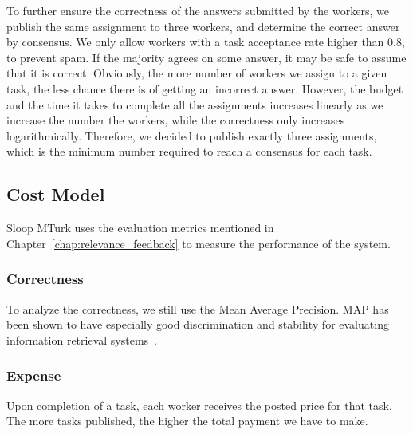 To further ensure the correctness of the answers submitted by the workers, we
publish the same assignment to three workers, and determine the correct answer
by consensus. We only allow workers with a task acceptance rate higher than
0.8, to prevent spam. If the majority agrees on some answer, it may be safe to
assume that it is correct. Obviously, the more number of workers we assign to a
given task, the less chance there is of getting an incorrect answer. However,
the budget and the time it takes to complete all the assignments increases
linearly as we increase the number the workers, while the
correctness only increases logarithmically. Therefore, we decided to publish
exactly three assignments, which is the minimum number required to reach a consensus
for each task.

\subsection{Cost Model}

Sloop MTurk uses the evaluation metrics mentioned in
Chapter~\ref{chap:relevance_feedback} to measure the performance of the system.

\subsubsection{Correctness}

To analyze the correctness, we still use the Mean Average Precision.  MAP has
been shown to have especially good discrimination and stability for evaluating
information retrieval
systems~\cite{manning2008introduction}.

\subsubsection{Expense}

Upon completion of a task, each worker receives the posted price for that
task. The more tasks published, the higher the total payment we have to make.
